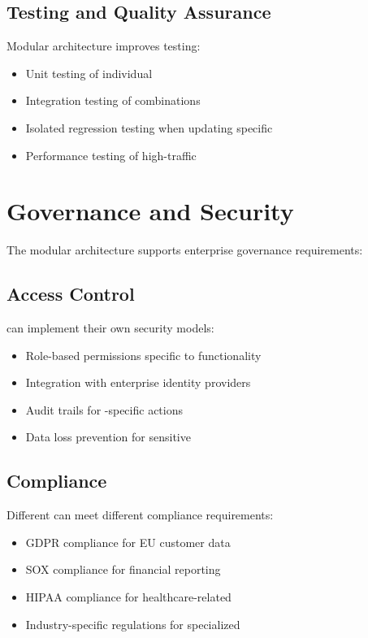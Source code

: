\subsection{Testing and Quality Assurance}

Modular architecture improves testing:
\begin{itemize}
\item Unit testing of individual 
\item Integration testing of \webbaselet{} combinations
\item Isolated regression testing when updating specific 
\item Performance testing of high-traffic 
\end{itemize}

\section{Governance and Security}
\label{sec:governance-security}

The modular architecture supports enterprise governance requirements:

\subsection{Access Control}

 can implement their own security models:
\begin{itemize}
\item Role-based permissions specific to \webbaselet{} functionality
\item Integration with enterprise identity providers
\item Audit trails for \webbaselet{}-specific actions
\item Data loss prevention for sensitive 
\end{itemize}

\subsection{Compliance}

Different  can meet different compliance requirements:
\begin{itemize}
\item GDPR compliance for EU customer data 
\item SOX compliance for financial reporting 
\item HIPAA compliance for healthcare-related 
\item Industry-specific regulations for specialized 
\end{itemize}


